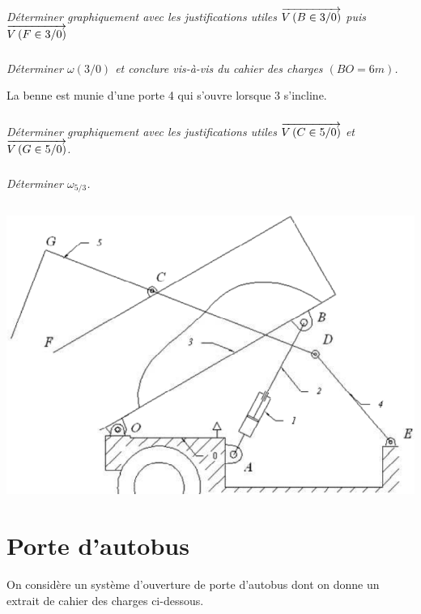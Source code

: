 \documentclass[10pt]{article}
\begin{document}
\subparagraph{}
\textit{Déterminer graphiquement avec les justifications utiles $\overrightarrow{V\left( {B} \in {3}/{0}\right)}$ puis $\overrightarrow{V\left( {F} \in {3}/{0}\right)}$}


\subparagraph{}
\textit{Déterminer $\omega(3/0)$ et conclure vis-à-vis du cahier des charges $(BO=6m)$.}

La benne est munie d'une porte 4 qui s'ouvre lorsque 3 s'incline.


\subparagraph{}
\textit{Déterminer graphiquement avec les justifications utiles $\overrightarrow{V\left( {C} \in {5}/{0}\right)}$ et $\overrightarrow{V\left( {G} \in {5}/{0}\right)}$.}


\subparagraph{}
\textit{Déterminer $\omega_{5/3}$.}


$$ \quad $$
\vspace{6cm}

\begin{center}
\includegraphics[width=.7\textwidth]{images/fig5}
\end{center}



\newpage

\section{Porte d'autobus}
\setcounter{subparagraph}{0}
On considère un système d'ouverture de porte d'autobus dont on donne un extrait de cahier des charges ci-dessous.
\end{document}
